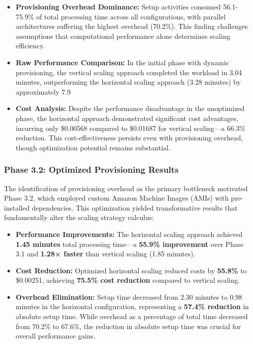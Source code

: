 \documentclass[conference]{IEEEtran}
\begin{document}
	\begin{itemize}
		\item \textbf{Provisioning Overhead Dominance:} Setup activities consumed 56.1-75.9\% of total processing time across all configurations, with parallel architectures suffering the highest overhead (70.2\%). This finding challenges assumptions that computational performance alone determines scaling efficiency.
		
		\item \textbf{Raw Performance Comparison:} In the initial phase with dynamic provisioning, the vertical scaling approach completed the workload in 3.04 minutes, outperforming the horizontal scaling approach (3.28 minutes) by approximately 7.9%
		
		\item \textbf{Cost Analysis:} Despite the performance disadvantage in the unoptimized phase, the horizontal approach demonstrated significant cost advantages, incurring only \$0.00568 compared to \$0.01687 for vertical scaling—a 66.3\% reduction. This cost-effectiveness persists even with provisioning overhead, though optimization potential remains substantial.
	\end{itemize}
	
	\subsubsection{Phase 3.2: Optimized Provisioning Results}
	
	The identification of provisioning overhead as the primary bottleneck motivated Phase 3.2, which employed custom Amazon Machine Images (AMIs) with pre-installed dependencies. This optimization yielded transformative results that fundamentally alter the scaling strategy calculus:
	\begin{itemize}
		\item \textbf{Performance Improvements:} The horizontal scaling approach achieved \textbf{1.45 minutes} total processing time—a \textbf{55.9\% improvement} over Phase 3.1 and \textbf{1.28× faster} than vertical scaling (1.85 minutes).
		
		\item \textbf{Cost Reduction:} Optimized horizontal scaling reduced costs by \textbf{55.8\%} to \$0.00251, achieving \textbf{75.5\% cost reduction} compared to vertical scaling.
		
		\item \textbf{Overhead Elimination:} Setup time decreased from 2.30 minutes to 0.98 minutes in the horizontal configuration, representing a \textbf{57.4\% reduction} in absolute setup time. While overhead as a percentage of total time decreased from 70.2\% to 67.6\%, the reduction in absolute setup time was crucial for overall performance gains.
	\end{itemize}
	
\end{document}
